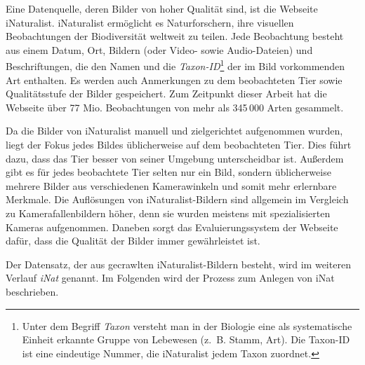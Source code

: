 Eine Datenquelle, deren Bilder von hoher Qualität sind, ist die Webseite iNaturalist. iNaturalist ermöglicht es Naturforschern, ihre visuellen Beobachtungen der Biodiversität weltweit zu teilen. Jede Beobachtung besteht aus einem Datum, Ort, Bildern (oder Video- sowie Audio-Dateien) und Beschriftungen, die den Namen und die \emph{Taxon-ID}\footnote{Unter dem Begriff \emph{Taxon} versteht man in der Biologie eine als systematische Einheit erkannte Gruppe von Lebewesen (z.~B. Stamm, Art). Die Taxon-ID ist eine eindeutige Nummer, die iNaturalist jedem Taxon zuordnet.} der im Bild vorkommenden Art enthalten. Es werden auch Anmerkungen zu dem beobachteten Tier sowie Qualitätsstufe der Bilder gespeichert. Zum Zeitpunkt dieser Arbeit hat die Webseite über 77 Mio. Beobachtungen von mehr als 345\,000 Arten gesammelt.

Da die Bilder von iNaturalist manuell und zielgerichtet aufgenommen wurden, liegt der Fokus jedes Bildes üblicherweise auf dem beobachteten Tier. Dies führt dazu, dass das Tier besser von seiner Umgebung unterscheidbar ist. Außerdem gibt es für jedes beobachtete Tier selten nur ein Bild, sondern üblicherweise mehrere Bilder aus verschiedenen Kamerawinkeln und somit mehr erlernbare Merkmale. Die Auflösungen von iNaturalist-Bildern sind allgemein im Vergleich zu Kamerafallenbildern höher, denn sie wurden meistens mit spezialisierten Kameras aufgenommen. Daneben sorgt das Evaluierungssystem der Webseite dafür, dass die Qualität der Bilder immer gewährleistet ist.

Der Datensatz, der aus gecrawlten iNaturalist-Bildern besteht, wird im weiteren Verlauf \emph{iNat} genannt. Im Folgenden wird der Prozess zum Anlegen von iNat beschrieben.

